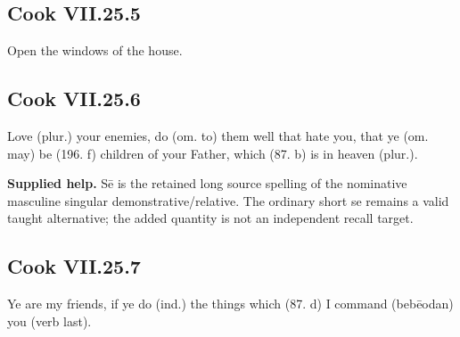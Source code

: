 \par\begin{minipage}{\linewidth}\raggedright
\subsection*{Cook VII.25.5}

Open the windows of the house.

\end{minipage}\par\addvspace{4pt}

\par\begin{minipage}{\linewidth}\raggedright
\subsection*{Cook VII.25.6}

Love (plur.) your enemies, do (om. to) them well that hate you, that ye (om. may) be (196. f) children of your Father, which (87. b) is in heaven (plur.).

\textbf{Supplied help.} Sē is the retained long source spelling of the nominative masculine singular demonstrative/\allowbreak{}relative. The ordinary short se remains a valid taught alternative; the added quantity is not an independent recall target.

\end{minipage}\par\addvspace{4pt}

\par\begin{minipage}{\linewidth}\raggedright
\subsection*{Cook VII.25.7}

Ye are my friends, if ye do (ind.) the things which (87. d) I command (bebēodan) you (verb last).

\end{minipage}\par\addvspace{4pt}

